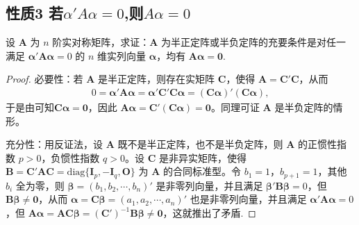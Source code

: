 \documentclass[../../main.tex]{subfiles}%
\begin{document}
\subsection{性质3 若$\alpha'A\alpha=0$,则$A\alpha=0$}

\begin{proposition}\label{proposition:半正/负定阵关于线性方程的充要条件}
设 $\boldsymbol{A}$ 为 $n$ 阶实对称矩阵，求证：$\boldsymbol{A}$ 为半正定阵或半负定阵的充要条件是对任一满足 $\boldsymbol{\alpha}'\boldsymbol{A}\boldsymbol{\alpha}=0$ 的 $n$ 维实列向量 $\boldsymbol{\alpha}$，均有 $\boldsymbol{A}\boldsymbol{\alpha}=\boldsymbol{0}$.
\end{proposition}
\begin{proof}

{\heiti 必要性：}若 $\boldsymbol{A}$ 是半正定阵，则存在实矩阵 $\boldsymbol{C}$，使得 $\boldsymbol{A}=\boldsymbol{C}'\boldsymbol{C}$，从而
\begin{align*}
0 = \boldsymbol{\alpha}'\boldsymbol{A}\boldsymbol{\alpha}=\boldsymbol{\alpha}'\boldsymbol{C}'\boldsymbol{C}\boldsymbol{\alpha}=(\boldsymbol{C}\boldsymbol{\alpha})'(\boldsymbol{C}\boldsymbol{\alpha}),
\end{align*}
于是由可知$\boldsymbol{C}\boldsymbol{\alpha}=\boldsymbol{0}$，因此 $\boldsymbol{A}\boldsymbol{\alpha}=\boldsymbol{C}'(\boldsymbol{C}\boldsymbol{\alpha})=\boldsymbol{0}$。同理可证 $\boldsymbol{A}$ 是半负定阵的情形。

{\heiti 充分性：}用反证法，设 $\boldsymbol{A}$ 既不是半正定阵，也不是半负定阵，则 $\boldsymbol{A}$ 的正惯性指数 $p > 0$，负惯性指数 $q > 0$。设 $\boldsymbol{C}$ 是非异实矩阵，使得 $\boldsymbol{B}=\boldsymbol{C}'\boldsymbol{A}\boldsymbol{C}=\mathrm{diag}\{\boldsymbol{I}_p,-\boldsymbol{I}_q,\boldsymbol{O}\}$ 为 $\boldsymbol{A}$ 的合同标准型。令 $b_1 = 1$，$b_{p + 1}= 1$，其他 $b_i$ 全为零，则 $\boldsymbol{\beta}=(b_1,b_2,\cdots,b_n)'$ 是非零列向量，并且满足 $\boldsymbol{\beta}'\boldsymbol{B}\boldsymbol{\beta}=0$，但 $\boldsymbol{B}\boldsymbol{\beta}\neq\boldsymbol{0}$，从而 $\boldsymbol{\alpha}=\boldsymbol{C}\boldsymbol{\beta}=(a_1,a_2,\cdots,a_n)'$ 也是非零列向量，并且满足 $\boldsymbol{\alpha}'\boldsymbol{A}\boldsymbol{\alpha}=0$，但 $\boldsymbol{A}\boldsymbol{\alpha}=\boldsymbol{A}\boldsymbol{C}\boldsymbol{\beta}=(\boldsymbol{C}')^{-1}\boldsymbol{B}\boldsymbol{\beta}\neq\boldsymbol{0}$，这就推出了矛盾.

\end{proof}
\end{document}
